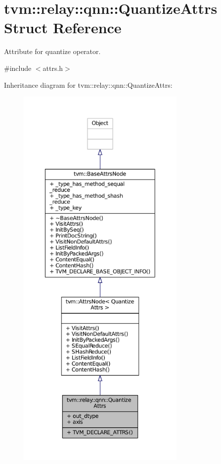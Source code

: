 \hypertarget{structtvm_1_1relay_1_1qnn_1_1QuantizeAttrs}{}\section{tvm\+:\+:relay\+:\+:qnn\+:\+:Quantize\+Attrs Struct Reference}
\label{structtvm_1_1relay_1_1qnn_1_1QuantizeAttrs}


Attribute for quantize operator.  




{\ttfamily \#include $<$attrs.\+h$>$}



Inheritance diagram for tvm\+:\+:relay\+:\+:qnn\+:\+:Quantize\+Attrs\+:
\nopagebreak
\begin{figure}[H]
\begin{center}
\leavevmode
\includegraphics[height=550pt]{structtvm_1_1relay_1_1qnn_1_1QuantizeAttrs__inherit__graph}
\end{center}
\end{figure}


